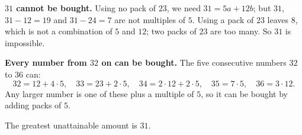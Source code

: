 \textbf{$31$ cannot be bought.} Using no pack of $23$, we need $31=5a+12b$; but $31$, $31-12=19$ and $31-24=7$ are not multiples of $5$. Using a pack of $23$ leaves $8$, which is not a combination of $5$ and $12$; two packs of $23$ are too many. So $31$ is impossible.

\textbf{Every number from $32$ on can be bought.} The five consecutive numbers $32$ to $36$ can:
\[
32=12+4\cdot5,\quad 33=23+2\cdot5,\quad 34=2\cdot12+2\cdot5,\quad 35=7\cdot5,\quad 36=3\cdot12 .
\]
Any larger number is one of these plus a multiple of $5$, so it can be bought by adding packs of $5$.

The greatest unattainable amount is $\boxed{31}$.
